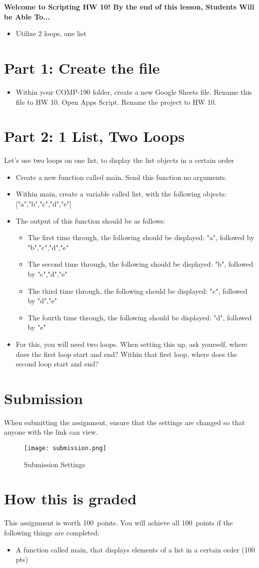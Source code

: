 \documentclass{article}
\newcommand{\AName}{Scripting HW 10}
\newcommand{\AValue}{100}
\begin{document}
\textbf{Welcome to \AName!  By the end of this lesson, Students Will be Able To...}
\begin{itemize}
    \item Utilize 2 loops, one list
\end{itemize}


\section*{Part 1: Create the file}
\begin{itemize}
    \item  Within your COMP-190 folder, create a new Google Sheets file.  Rename this file to HW 10.  Open Apps Script.  Rename the project to HW 10.
\end{itemize}

\section*{Part 2: 1 List, Two Loops}
Let's use two loops on one list, to display the list objects in a certain order
\begin{itemize}
    \item Create a new function called main.  Send this function no arguments.
    \item Within main, create a variable called list, with the following objects:  ["a","b","c","d","e"]
    \item The output of this function should be as follows:
    \begin{itemize}
    		\item The first time through, the following should be displayed:  "a", followed by "b","c","d","e"
    		\item The second time through, the following should be displayed:  "b", followed by "c","d","e"
    		\item The third time through, the following should be displayed:  "c", followed by "d","e"
    		\item The fourth time through, the following should be displayed:  "d", followed by "e"
    	\end{itemize}
    	\item For this, you will need two loops.  When setting this up, ask yourself, where does the first loop start and end?  Within that first loop, where does the second loop start and end?
\end{itemize}

\section*{Submission}
When submitting the assignment, ensure that the settings are changed so that anyone with the link can view.
\begin{figure}[H]
  \centering
  \texttt{[image: submission.png]}
  \caption{Submission Settings}
\end{figure}

\section*{How this is graded}
This assignment is worth \AValue \ points. You will achieve all \AValue \   points if the following things are completed:
\begin{itemize}
    \item A function called main, that displays elements of a list in a certain order (100 pts)
\end{itemize}
\end{document}
